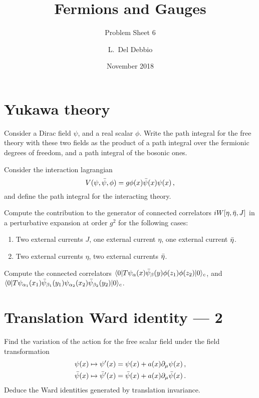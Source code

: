 \documentclass{tutorial}
\subtitle{Problem Sheet 6}
\title{Fermions and Gauges}
\author{L.~Del Debbio}
\date{November 2018}
\begin{document}
\maketitle

\section{Yukawa theory}

Consider a Dirac field $\psi$, and a real scalar $\phi$. Write the
path integral for the free theory with these two fields as the
product of a path integral over the fermionic degrees of freedom,
and a path integral of the bosonic ones.

Consider the interaction lagrangian
\[
  V(\psi,\bar{\psi},\phi) = g \phi(x) \bar{\psi}(x) \psi(x)\, ,
\]
and define the path integral for the interacting theory.

Compute the contribution to the generator of connected correlators
$iW[\eta,\bar{\eta}, J]$ in a perturbative expansion at order $g^2$
for the following cases:
\begin{enumerate}
  \item Two external currents $J$, one external current $\eta$, one
        external current $\bar{\eta}$.
  \item Two external currents $\eta$, two
        external currents $\bar{\eta}$.
\end{enumerate}

Compute the connected correlators
$\langle 0 | T \psi_\alpha(x) \bar{\psi}_\beta(y) \phi(z_1)
  \phi(z_2)| 0 \rangle_c$,
and \\
$\langle 0 | T \psi_{\alpha_1}(x_1) \bar{\psi}_{\beta_1}(y_1)
  \psi_{\alpha_2}(x_2) \bar{\psi}_{\beta_2}(y_2) |0\rangle_c$.



\section{Translation Ward identity --- 2}

Find the variation of the action for the free scalar field under
the field transformation
\begin{align*}
  \psi(x)    & \mapsto \psi'(x) = \psi(x) + a(x) \partial_\mu \psi(x)\,
  ,                                                                              \\
  \bar{\psi}(x) & \mapsto \bar{\psi}'(x) = \bar{\psi}(x) + a(x) \partial_\mu \bar{\psi}(x)\,
  .
\end{align*}
Deduce the Ward identities generated by translation invariance.
\end{document}
